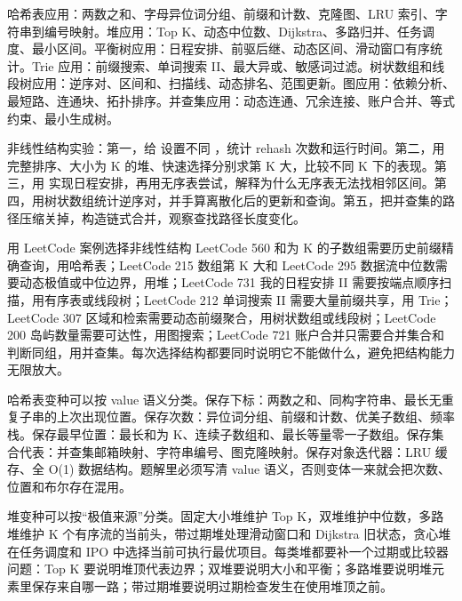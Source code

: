 
哈希表应用：两数之和、字母异位词分组、前缀和计数、克隆图、LRU 索引、字符串到编号映射。堆应用：Top K、动态中位数、Dijkstra、多路归并、任务调度、最小区间。平衡树应用：日程安排、前驱后继、动态区间、滑动窗口有序统计。Trie 应用：前缀搜索、单词搜索 II、最大异或、敏感词过滤。树状数组和线段树应用：逆序对、区间和、扫描线、动态排名、范围更新。图应用：依赖分析、最短路、连通块、拓扑排序。并查集应用：动态连通、冗余连接、账户合并、等式约束、最小生成树。

\begin{labbox}
非线性结构实验：第一，给  设置不同 ，统计 rehash 次数和运行时间。第二，用完整排序、大小为 K 的堆、快速选择分别求第 K 大，比较不同 K 下的表现。第三，用  实现日程安排，再用无序表尝试，解释为什么无序表无法找相邻区间。第四，用树状数组统计逆序对，并手算离散化后的更新和查询。第五，把并查集的路径压缩关掉，构造链式合并，观察查找路径长度变化。
\end{labbox}

\begin{principlebox}{用 LeetCode 案例选择非线性结构}
LeetCode 560 和为 K 的子数组需要历史前缀精确查询，用哈希表；LeetCode 215 数组第 K 大和 LeetCode 295 数据流中位数需要动态极值或中位边界，用堆；LeetCode 731 我的日程安排 II 需要按端点顺序扫描，用有序表或线段树；LeetCode 212 单词搜索 II 需要大量前缀共享，用 Trie；LeetCode 307 区域和检索需要动态前缀聚合，用树状数组或线段树；LeetCode 200 岛屿数量需要可达性，用图搜索；LeetCode 721 账户合并只需要合并集合和判断同组，用并查集。每次选择结构都要同时说明它不能做什么，避免把结构能力无限放大。
\end{principlebox}


哈希表变种可以按 value 语义分类。保存下标：两数之和、同构字符串、最长无重复子串的上次出现位置。保存次数：异位词分组、前缀和计数、优美子数组、频率栈。保存最早位置：最长和为 K、连续子数组和、最长等量零一子数组。保存集合代表：并查集邮箱映射、字符串编号、图克隆映射。保存对象迭代器：LRU 缓存、全 O(1) 数据结构。题解里必须写清 value 语义，否则变体一来就会把次数、位置和布尔存在混用。

堆变种可以按“极值来源”分类。固定大小堆维护 Top K，双堆维护中位数，多路堆维护 K 个有序流的当前头，带过期堆处理滑动窗口和 Dijkstra 旧状态，贪心堆在任务调度和 IPO 中选择当前可执行最优项目。每类堆都要补一个过期或比较器问题：Top K 要说明堆顶代表边界；双堆要说明大小和平衡；多路堆要说明堆元素里保存来自哪一路；带过期堆要说明过期检查发生在使用堆顶之前。


